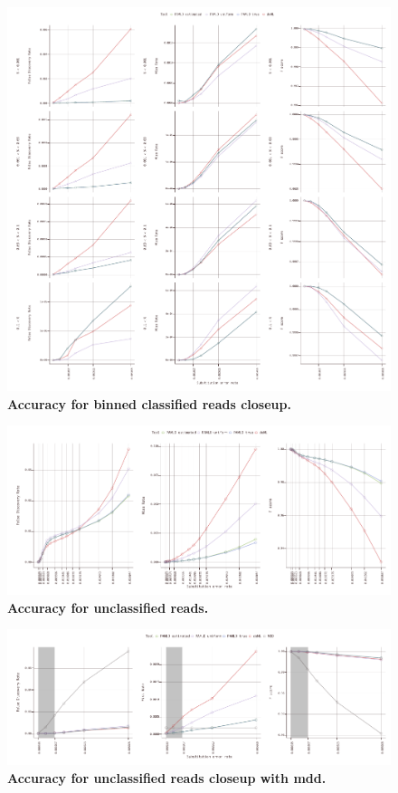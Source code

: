 \documentclass[10pt,twocolumn]{article}
\begin{document}
\begin{figure}[htbp]
\centering
\includegraphics[keepaspectratio,scale=1]{../plot/8_classified_accuracy_0060_binned}
\caption{\footnotesize{\textbf{Accuracy for binned classified reads closeup.} } }
\label{fig:08}
\end{figure}

\begin{figure}[htbp]
\centering
\includegraphics[keepaspectratio,scale=1]{../plot/9_unclassified_accuracy_0550}
\caption{\footnotesize{\textbf{Accuracy for unclassified reads.} } }
\label{fig:09}
\end{figure}

\begin{figure}[htbp]
\centering
\includegraphics[keepaspectratio,scale=1]{../plot/10_unclassified_accuracy_0060_mdd}
\caption{\footnotesize{\textbf{Accuracy for unclassified reads closeup with mdd.} } }
\label{fig:10}
\end{figure}
\end{document}
